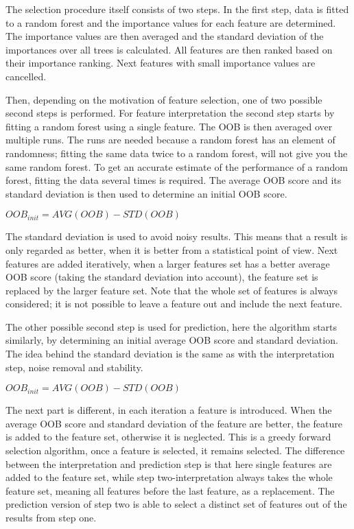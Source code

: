 \npar

The selection procedure itself consists of two steps. In the first step, data is fitted to a random forest and the importance values for each feature are determined. The importance values are then averaged and the standard deviation of the importances over all trees is calculated. All features are then ranked based on their importance ranking. Next features with small importance values are cancelled. 

\npar

Then, depending on the motivation of feature selection, one of two possible second steps is performed. For feature interpretation the second step starts by fitting a random forest using a single feature. The OOB is then averaged over multiple runs. The runs are needed because a random forest has an element of randomness; fitting the same data twice to a random forest, will not give you the same random forest. To get an accurate estimate of the performance of a random forest, fitting the data several times is required. The average OOB score and its standard deviation is then used to determine an initial OOB score.

\begin{center}
$OOB_{init} = AVG(OOB) - STD(OOB)$
\end{center}

The standard deviation is used to avoid noisy results. This means that a result is only regarded as better, when it is better from a statistical point of view. Next features are added iteratively, when a larger features set has a better average OOB score (taking the standard deviation into account), the feature set is replaced by the larger feature set. Note that the whole set of features is always considered; it is not possible to leave a feature out and include the next feature.

\npar

The other possible second step is used for prediction, here the algorithm starts similarly, by determining an initial average OOB score and standard deviation. The idea behind the standard deviation is the same as with the interpretation step, noise removal and stability.

\begin{center}
$OOB_{init} = AVG(OOB) - STD(OOB)$
\end{center}

The next part is different, in each iteration a feature is introduced. When the average OOB score and standard deviation of the feature are better, the feature is added to the feature set, otherwise it is neglected. This is a greedy forward selection algorithm, once a feature is selected, it remains selected. The difference between the interpretation and prediction step is that here single features are added to the feature set, while step two-interpretation always takes the whole feature set, meaning all features before the last feature, as a replacement. The prediction version of step two is able to select a distinct set of features out of the results from step one.

